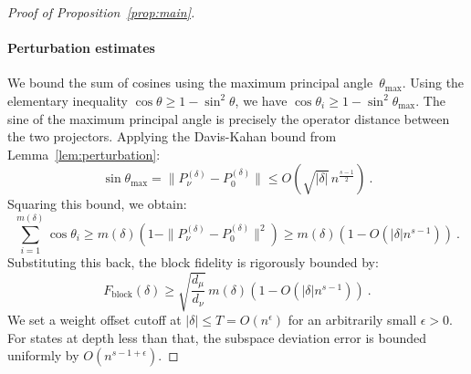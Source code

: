 \documentclass[11pt,letterpaper]{article}
\begin{document}
\begin{proof}[Proof of Proposition~\ref{prop:main}]
\paragraph{Perturbation estimates}
We bound the sum of cosines using the maximum principal angle~$\theta_{\max}$. Using the elementary inequality $\cos \theta \ge 1 - \sin^2 \theta$, we have $\cos \theta_i \ge 1 - \sin^2 \theta_{\max}$. 
The sine of the maximum principal angle is precisely the operator distance between the two projectors. Applying the Davis-Kahan bound from Lemma~\ref{lem:perturbation}:
\begin{equation}
    \sin \theta_{\max} = \|P_\nu^{(\delta)} - P_0^{(\delta)}\| \le O\left(\sqrt{|\delta|} \, n^{\frac{s-1}{2}}\right) \ .
\end{equation}
Squaring this bound, we obtain:
\begin{equation}
    \sum_{i=1}^{m(\delta)} \cos \theta_i \ge m(\delta) \left( 1 - \|P_\nu^{(\delta)} - P_0^{(\delta)}\|^2 \right) \ge m(\delta) \left( 1 - O(|\delta| n^{s-1}) \right) \ .
\end{equation}
Substituting this back, the block fidelity is rigorously bounded by:
\begin{equation}
    F_{\mathrm{block}}(\delta) \ge \sqrt{\frac{d_\mu}{d_\nu}} \, m(\delta) \left( 1 - O(|\delta| n^{s-1}) \right) \ .
\end{equation}
We set a weight offset cutoff at $|\delta|\le T = O(n^\epsilon)$ for an arbitrarily small $\epsilon > 0$. For states at depth less than that, the subspace deviation error is bounded uniformly by $O(n^{s-1+\epsilon})$. 


\end{proof}
\end{document}
